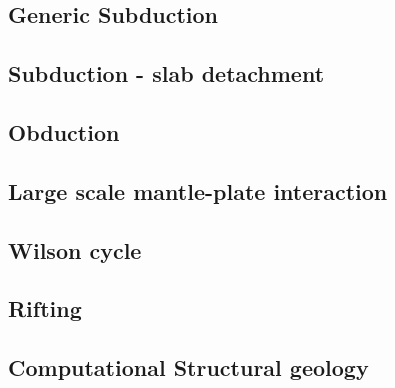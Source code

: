 \subsection*{Generic Subduction}

\cite{artd07}
\cite{anwb12}
\cite{ancv13}

\subsection*{Subduction - slab detachment}

\cite{anbi09}

\subsection*{Obduction}

\cite{agzf14}

\subsection*{Large scale mantle-plate interaction}

\cite{algs12}

\subsection*{Wilson cycle}

\subsection*{Rifting}

\cite{agcz09}
\cite{aubh10}
\cite{alht11}
\cite{alht12}
\cite{alhf12}

\subsection*{Computational Structural geology}

\cite{acgf00}

